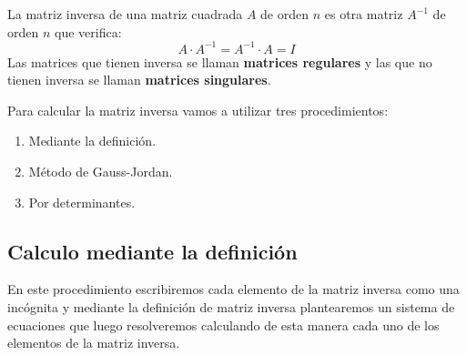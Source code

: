 \begin{definicion}
La matriz inversa de una matriz cuadrada $A$ de orden $n$ es otra matriz $A^{-1}$ de orden $n$ que verifica:
\[
A\cdot A^{-1}=A^{-1} \cdot A = I
\]
Las matrices que tienen inversa se llaman \textbf{matrices regulares} y las que no tienen inversa se llaman \textbf{matrices singulares}.
\end{definicion}

Para calcular la matriz inversa vamos a utilizar tres procedimientos:
\begin{enumerate}
\item Mediante la definición.
\item Método de Gauss-Jordan.
\item Por determinantes.
\end{enumerate}

\subsection{Calculo mediante la definición}

En este procedimiento escribiremos cada elemento de la matriz inversa como una incógnita y mediante la definición de matriz inversa plantearemos un sistema de ecuaciones que luego resolveremos calculando de esta manera cada uno de los elementos de la matriz inversa.

